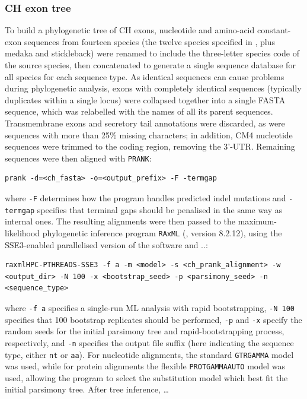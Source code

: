 \subsubsection{CH exon tree}
\label{sec:phylo_methods_ch}


To build a phylogenetic tree of CH exons, nucleotide and amino-acid constant-exon sequences from fourteen species (the twelve species specified in , plus medaka and stickleback) were renamed to include the three-letter species code of the source species, then concatenated to generate a single sequence database for all species for each sequence type. As identical sequences can cause problems during phylogenetic analysis, exons with completely identical sequences (typically duplicates within a single locus) were collapsed together into a single FASTA sequence, which was relabelled with the names of all its parent sequences. Transmembrane exons and secretory tail annotations were discarded, as were sequences with more than 25\% missing characters; in addition, CM4 nucleotide sequences were trimmed to the coding region, removing the 3'-UTR. Remaining sequences were then aligned with \lstinline{PRANK}:

\begin{lstlisting}
prank -d=<ch_fasta> -o=<output_prefix> -F -termgap
\end{lstlisting}

where \lstinline{-F} determines how the program handles predicted indel mutations and \lstinline{-termgap} specifies that terminal gaps should be penalised in the same way as internal ones. The resulting alignments were then passed to the maximum-likelihood phylogenetic inference program \lstinline{RAxML} (\parencite{stamatakis2005raxml3,stamatakis2006raxml6,stamatakis2014raxml8}, version 8.2.12), using the SSE3-enabled parallelised version of the software and ..:

\begin{lstlisting}
raxmlHPC-PTHREADS-SSE3 -f a -m <model> -s <ch_prank_alignment> -w <output_dir> -N 100 -x <bootstrap_seed> -p <parsimony_seed> -n <sequence_type>
\end{lstlisting}

where \lstinline{-f a} specifies a single-run ML analysis with rapid bootstrapping, \lstinline{-N 100} specifies that 100 bootstrap replicates should be performed, \lstinline{-p} and \lstinline{-x} specify the random seeds for the initial parsimony tree and rapid-bootstrapping process, respectively, and  \lstinline{-n} specifies the output file suffix (here indicating the sequence type, either \lstinline{nt} or \lstinline{aa}). For nucleotide alignments, the standard \lstinline{GTRGAMMA} model was used, while for protein alignments the flexible \lstinline{PROTGAMMAAUTO} model was used, allowing the program to select the substitution model which best fit the initial parsimony tree. After tree inference, \dots %

